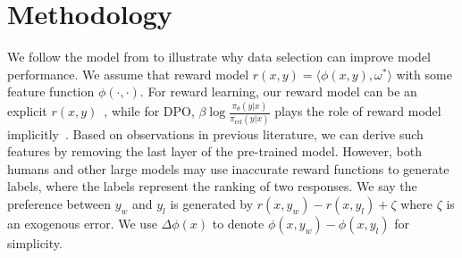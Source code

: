 \section{Methodology}
\label{sec:method}


We follow the model from \citet{zhu2023principled} to illustrate why data selection can improve model performance. We assume that reward model $r(x,y)=\langle \phi(x,y),\omega^*\rangle$ with some feature function $\phi(\cdot,\cdot)$. 
For reward learning, our reward model can be an explicit $r(x,y)$~\citep{ouyang2022training}, while for DPO, $\beta\log\frac{\pi_\theta(y|x)}{\pi_{\mathrm{ref}}(y|x)}$ plays the role of reward model implicitly~\citep{rafailov2024direct}.
Based on observations in previous literature, we
can derive such features by 
removing the last layer of the pre-trained model. However, both humans and other large models may use inaccurate reward functions to generate labels, where the labels represent the ranking of two responses. We say the preference between $y_w$ and $y_l$ is generated by $r(x,y_w)-r(x,y_l)+\zeta$ where $\zeta$ is an exogenous error. 
We use $\Delta\phi(x)$ to denote $\phi(x,y_w)-\phi(x,y_l)$ for simplicity.

